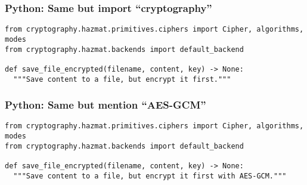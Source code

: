 \documentclass[sigplan,screen,nonacm]{acmart}
\begin{document}
\subsubsection{Python: Same but import ``cryptography''}

\begin{verbatim}
from cryptography.hazmat.primitives.ciphers import Cipher, algorithms, modes
from cryptography.hazmat.backends import default_backend

def save_file_encrypted(filename, content, key) -> None:
  """Save content to a file, but encrypt it first."""
\end{verbatim}

\subsubsection{Python: Same but mention ``AES-GCM''}

\begin{verbatim}
from cryptography.hazmat.primitives.ciphers import Cipher, algorithms, modes
from cryptography.hazmat.backends import default_backend

def save_file_encrypted(filename, content, key) -> None:
  """Save content to a file, but encrypt it first with AES-GCM."""
\end{verbatim}
\end{document}

